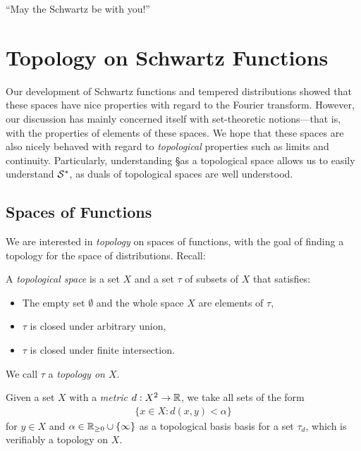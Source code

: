 
  \begin{savequote}
    ``May the Schwartz be with you!''
  \end{savequote}
  \chapter{Topology on Schwartz Functions}
    \label{ch:topons}
    Our development of Schwartz functions and tempered distributions showed that these spaces have nice properties with regard to the Fourier transform.
    However, our discussion has mainly concerned itself with set-theoretic notions---that is, with the properties of elements of these spaces.
    We hope that these spaces are also nicely behaved with regard to \emph{topological} properties such as limits and continuity.
    Particularly, understanding \S as a topological space allows us to easily understand $\S^*$, as duals of topological spaces are well understood.

    \section{Spaces of Functions}
      \label{sec:spcoffunc}
      We are interested in \emph{topology} on spaces of functions, with the goal of finding a topology for the space of distributions.
      Recall:
      \begin{defn}
        A \emph{topological space} is a set $X$ and a set $\tau$ of subsets of $X$ that satisfies:
        \begin{itemize}
          \item The empty set $\emptyset$ and the whole space $X$ are elements of $\tau$,
          \item $\tau$ is closed under arbitrary union,
          \item $\tau$ is closed under finite intersection.
        \end{itemize}
        We call $\tau$ a \emph{topology on $X$}.

        Given a set $X$ with a \emph{metric} $d:X^2\rightarrow\R$, we take all sets of the form 
        \begin{align*}
          \{x\in X:d(x,y)<\alpha\}
        \end{align*}
        for $y\in X$ and $\alpha\in\R_{\ge0}\cup\{\infty\}$ as a topological basis basis for a set $\tau_d$, which is verifiably a topology on $X$.
      \end{defn}


